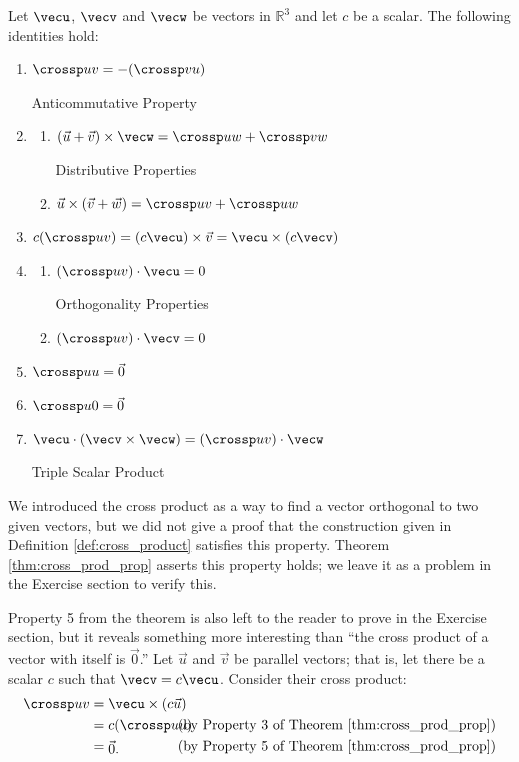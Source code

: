 \setboxwidth{15pt}
{Let $\vecu$, $\vecv$ and $\vecw$ be vectors in $\mathbb{R}^3$ and let $c$ be a scalar. The following identities hold:
\begin{enumerate}
	\item \parbox{167pt}{$\crossp uv = -(\crossp vu)$} Anticommutative Property
	\item	\begin{enumerate}
		\item \parbox{145pt}{$(\vec u+\vec v)\times \vecw = \crossp uw+\crossp vw$} Distributive Properties
		\item	$\vec u \times (\vec v+\vec w) = \crossp uv+\crossp uw$
	\end{enumerate}
	\item		$c(\crossp uv) = (c\vecu) \times \vec v = \vecu \times (c\vecv)$
	\item		\begin{enumerate}
		\item \parbox{145pt}{$(\crossp uv)\cdot \vecu = 0$} Orthogonality Properties
		\item	$(\crossp uv)\cdot \vecv = 0$
	\end{enumerate}
	\item		$\crossp uu = \vec 0$
	\item		$\crossp u0 = \vec 0$
	\item		\parbox{167pt}{$\vecu \cdot (\vecv\times\vecw) = (\crossp uv)\cdot \vecw$} Triple Scalar Product
\end{enumerate}
}
\restoreboxwidth

We introduced the cross product as a way to find a vector orthogonal to two given vectors, but we did not give a proof that the construction given in Definition \ref{def:cross_product} satisfies this property. Theorem \ref{thm:cross_prod_prop} asserts this property holds; we leave it as a problem in the Exercise section to verify this.

Property 5 from the theorem is also left to the reader to prove in the Exercise section, but it reveals something more interesting than ``the cross product of a vector with itself is $\vec 0$.'' Let $\vec u$ and $\vec v$ be parallel vectors; that is, let there be a scalar $c$ such that $\vecv = c\vecu$. Consider their cross product:
\begin{align*}
\crossp uv &= \vecu \times (c\vec u) \\
					&=	\parbox{50pt}{$c(\crossp uu)$}\text{(by Property 3 of Theorem \ref{thm:cross_prod_prop})}\\
					&= \parbox{50pt}{$\vec 0$.}\text{(by Property 5 of Theorem \ref{thm:cross_prod_prop})}
\end{align*}

